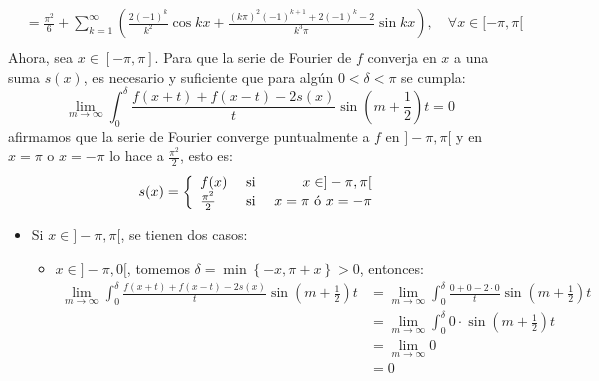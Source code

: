 \documentclass[12pt]{report}
\theoremstyle{largebreak}
\begin{document}
\begin{sol}
\begin{equation*}
\begin{split}
                &=\frac{\pi^2}{6}+\sum_{ k=1}^\infty\left(\frac{2(-1)^k}{k^2}\cos kx+\frac{(k\pi)^2(-1)^{k+1}+2(-1)^k-2}{k^3\pi}\sin kx\right),\quad\forall x\in[-\pi,\pi[ \\
            \end{split}
        \end{equation*}
        Ahora, sea $x\in[-\pi,\pi]$. Para que la serie de Fourier de $f$ converja en $x$ a una suma $s(x)$, es necesario y suficiente que para algún $0<\delta<\pi$ se cumpla:
        \begin{equation*}
            \lim_{m\rightarrow\infty}\int_{0}^\delta\frac{f(x+t)+f(x-t)-2s(x)}{t}\sin\left(m+\frac{1}{2}\right)t=0
        \end{equation*}
        afirmamos que la serie de Fourier converge puntualmente a $f$ en $]-\pi,\pi[$ y en $x=\pi$ o $x=-\pi$ lo hace a $\frac{\pi^2}{2}$, esto es:
        \begin{equation*}
            s(x)=\left\{
                \begin{array}{lcr}
                    f(x) & \textup{ si } & x\in]-\pi,\pi[\\
                    \frac{\pi^2}{2} & \textup{ si } & x=\pi\textup{ ó }x=-\pi\\
                \end{array}
            \right.
        \end{equation*}
        \begin{itemize}
            \item Si $x\in]-\pi,\pi[$, se tienen dos casos:
            \begin{itemize}
                \item $x\in]-\pi,0[$, tomemos $\delta=\min\left\{-x,\pi+x\right\}>0$, entonces:
                \begin{equation*}
                    \begin{split}
                        \lim_{m\rightarrow\infty}\int_{0}^\delta\frac{f(x+t)+f(x-t)-2s(x)}{t}\sin\left(m+\frac{1}{2}\right)t&=\lim_{m\rightarrow\infty}\int_{0}^{\delta}\frac{0+0-2\cdot0}{t}\sin\left(m+\frac{1}{2}\right)t\\
                        &=\lim_{m\rightarrow\infty}\int_{0}^{\delta}0\cdot\sin\left(m+\frac{1}{2}\right)t\\
                        &=\lim_{m\rightarrow\infty}0\\
                        &=0\\
                    \end{split}

\end{equation*}
\end{itemize}
\end{itemize}
\end{sol}
\end{document}

